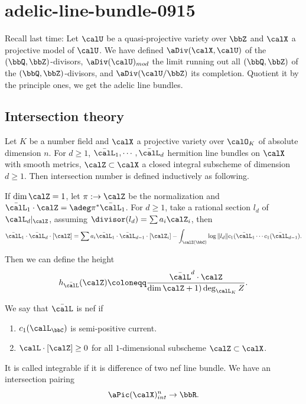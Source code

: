 \section{adelic-line-bundle-0915}

Recall last time:
Let $\calU$ be a quasi-projective variety over $\bbZ$ and $\calX$ a projective model of $\calU$.
We have defined $\aDiv(\calX,\calU)$ of the $(\bbQ,\bbZ)$-divisors, $\aDiv(\calU)_{mod}$ the limit running out all $(\bbQ,\bbZ)$ of the $(\bbQ,\bbZ)$-divisors, and $\aDiv(\calU/\bbZ)$ its completion.
Quotient it by the principle ones, we get the adelic line bundles.


\subsection[status=draft,tag=0000000,label=\labelNFM{subsec:inter}]{Intersection theory}

Let $K$ be a number field and $\calX$ a projective variety over $\calO_K$ of absolute dimension $n$.
For $d \geq 1$, $\bar{\calL}_1,\cdots, \bar{\calL}_d$ hermition line bundles on $\calX$ with smooth metrics, $\calZ \subset \calX$ a closed integral subscheme of dimension $d \geq 1$.
Then intersection number is defined inductively as following.

If $\dim \calZ = 1$, let $\pi: \title{\calZ} \to \calZ$ be the normalization and $\bar{\calL}_1 \cdot \calZ = \adeg \pi^* \bar{\calL}_1$.
For $d \geq 1$, take a rational section $l_d$ of $\calL_d|_\calZ$, assuming $\divisor(l_d) = \sum a_i \calZ_i$, then
\[ \bar{\calL}_1 \cdot \bar{\calL}_d \cdot [\calZ] = \sum a_i \bar{\calL}_1 \cdot \bar{\calL}_{d-1} \cdot [\calZ_i] - \int_{\calZ(\bbC)} \log \|l_d\| c_1(\bar{\calL}_1 \cdots c_1(\bar{\calL}_{d-1}). \]

Then we can define the height
\[ h_{\bar{\calL}}(\calZ) \coloneqq \frac{\bar{\calL}^d \cdot \calZ}{\dim \calZ + 1) \deg_{\calL_K} Z}. \]

We say that $\bar{\calL}$ is nef if
\begin{enumerate}
	\item $c_1(\calL_\bbC)$ is semi-positive current.
	\item $\calL \cdot [\calZ] \geq 0$ for all $1$-dimensional subscheme $\calZ \subset \calX$.
\end{enumerate}
It is called integrable if it is difference of two nef line bundle.
We have an intersection pairing
\[ \aPic(\calX)_{int}^n \to \bbR. \]


